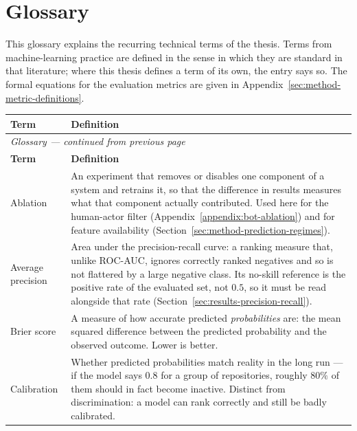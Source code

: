 \chapter*{Glossary}
\label{chap:glossary}

This glossary explains the recurring technical terms of the thesis.
Terms from machine-learning practice are defined in the sense in which they are
standard in that literature; where this thesis defines a term of its own, the entry
says so. The formal equations for the evaluation metrics are given in
Appendix~\ref{sec:method-metric-definitions}.

{\renewcommand{\arraystretch}{1.35}
\begin{longtable}{p{} p{}}
\hline
\textbf{Term} & \textbf{Definition} \\
\hline
\endfirsthead
\multicolumn{2}{l}{\small\itshape Glossary --- continued from previous page} \\
\hline
\textbf{Term} & \textbf{Definition} \\
\hline
\endhead

Ablation &
An experiment that removes or disables one component of a system and retrains it,
so that the difference in results measures what that component actually
contributed. Used here for the human-actor filter
(Appendix~\ref{appendix:bot-ablation}) and for feature availability
(Section~\ref{sec:method-prediction-regimes}). \\

Average precision &
Area under the precision-recall curve: a ranking measure that, unlike ROC-AUC,
ignores correctly ranked negatives and so is not flattered by a large negative
class. Its no-skill reference is the positive rate of the evaluated set, not
\(0.5\), so it must be read alongside that rate
(Section~\ref{sec:results-precision-recall}). \\

Brier score &
A measure of how accurate predicted \emph{probabilities} are: the mean squared
difference between the predicted probability and the observed outcome. Lower is
better. \\

Calibration &
Whether predicted probabilities match reality in the long run --- if the model
says \(0.8\) for a group of repositories, roughly \(80\%\) of them should in fact
become inactive. Distinct from discrimination: a model can rank correctly and
still be badly calibrated. \\


\end{longtable}}

